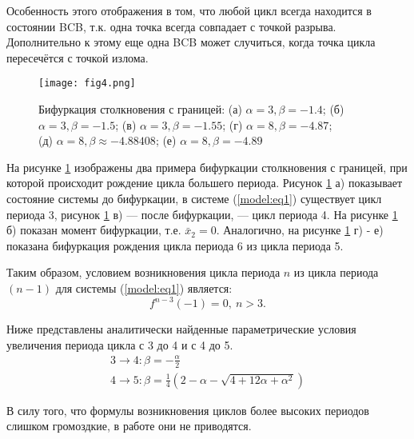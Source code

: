 \documentclass[a4paper, 14pt]{extreport}
\numberwithin{equation}{section}
\numberwithin{figure}{section}
\numberwithin{table}{section}
\begin{document}
			Особенность этого отображения в том, что любой цикл всегда находится в состоянии BCB, т.к. одна точка всегда совпадает с точкой разрыва. Дополнительно к этому еще одна BCB может случиться, когда точка цикла пересечётся с точкой излома. %

			\begin{figure}[h!]
				\begin{center}
					\texttt{[image: fig4.png]}
				\end{center}
				\caption{Бифуркация столкновения с границей: (а) $ \alpha = 3, \beta = -1.4 $; (б) $ \alpha = 3, \beta = -1.5 $; (в) $ \alpha = 3, \beta = -1.55 $; (г) $ \alpha = 8, \beta = -4.87 $; \\(д) $ \alpha = 8, \beta \approx -4.88408 $; (е) $ \alpha = 8, \beta = -4.89 $}
				\label{fig4}		
			\end{figure}
			На рисунке \ref{fig4} изображены два примера бифуркации столкновения с границей, при которой происходит рождение цикла большего периода. Рисунок \ref{fig4} а) показывает состояние системы до бифуркации, в системе (\ref{model:eq1}) существует цикл периода 3, рисунок \ref{fig4} в) --- после бифуркации, --- цикл периода 4. На рисунке \ref{fig4} б) показан момент бифуркации, т.е. $ \bar{x}_{2} = 0 $. Аналогично, на рисунке \ref{fig4} г) - е) показана бифуркация рождения цикла периода 6 из цикла периода 5. %
			
			Таким образом, условием возникновения цикла периода $ n $ из цикла периода $ (n - 1) $ для системы (\ref{model:eq1}) является:
			\begin{equation}
				f^{n - 3}(-1) = 0,~n > 3.
			\end{equation} %

			Ниже представлены аналитически найденные параметрические условия увеличения периода цикла с 3 до 4 и с 4 до 5.
			\begin{equation}
				\begin{array}{l}
					3 \to 4: \beta = -\frac{\alpha}{2} \\[1mm]
					4 \to 5: \beta = \frac{1}{4} (2 - \alpha - \sqrt{4 + 12 \alpha + \alpha^{2}})
				\end{array}
			\end{equation}

			 В силу того, что формулы возникновения циклов более высоких периодов слишком громоздкие, в работе они не приводятся.
\end{document}
